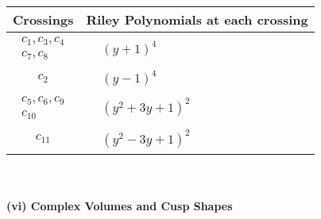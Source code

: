 \documentclass[1p]{elsarticle_modified}
\theoremstyle{definition}
\begin{document}
\begin{tabular}{m{50pt}|m{274pt}}
Crossings & \hspace{64pt}Riley Polynomials at each crossing \\
\hline $$\begin{aligned}c_{1},c_{3},c_{4}\\c_{7},c_{8}\end{aligned}$$&$\begin{aligned}
&(y+1)^4
\end{aligned}$\\
\hline $$\begin{aligned}c_{2}\end{aligned}$$&$\begin{aligned}
&(y-1)^4
\end{aligned}$\\
\hline $$\begin{aligned}c_{5},c_{6},c_{9}\\c_{10}\end{aligned}$$&$\begin{aligned}
&(y^2+3 y+1)^2
\end{aligned}$\\
\hline $$\begin{aligned}c_{11}\end{aligned}$$&$\begin{aligned}
&(y^2-3 y+1)^2
\end{aligned}$\\
\hline
\end{tabular}\\~\\
\newpage\flushleft \textbf{(vi) Complex Volumes and Cusp Shapes}
\end{document}
